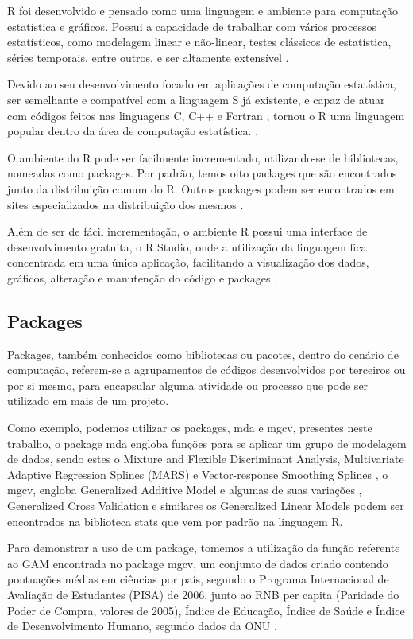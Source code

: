 \documentclass[
    12pt,               %
    openright,          %
    oneside,            %
    a4paper,            %
    english,            %
    brazil              %
    ]{abntex2}
\begin{document}
R foi desenvolvido e pensado como uma linguagem e ambiente para computação estatística e gráficos. Possui a capacidade de trabalhar com 
vários processos estatísticos, como modelagem linear e não-linear, testes clássicos de estatística, séries temporais, entre outros, 
e ser altamente extensível \cite{ling_r}.

Devido ao seu desenvolvimento focado em aplicações de computação estatística, ser semelhante e compatível com a linguagem S já existente, 
e capaz de atuar com códigos feitos nas linguagens C, C++ e Fortran \cite{ling_r}, tornou o R uma linguagem popular dentro da área 
de computação estatística. \cite{linguagem_r}.

O ambiente do R pode ser facilmente incrementado, utilizando-se de bibliotecas, nomeadas como packages. Por padrão, temos oito packages 
que são encontrados junto da distribuição comum do R. Outros packages podem ser encontrados em sites especializados na distribuição dos 
mesmos \cite{ling_r}.

Além de ser de fácil incrementação, o ambiente R possui uma interface de desenvolvimento gratuita, o R Studio, onde a utilização da 
linguagem fica concentrada em uma única aplicação, facilitando a visualização dos dados, gráficos, alteração e manutenção do código e 
packages \cite{rstudio}.

\subsection{Packages}

Packages, também conhecidos como bibliotecas ou pacotes, dentro do cenário de computação, referem-se a agrupamentos de códigos 
desenvolvidos por terceiros ou por si mesmo, para encapsular alguma atividade ou processo que pode ser utilizado em mais de um projeto.

Como exemplo, podemos utilizar os packages, mda e mgcv, presentes neste trabalho, o package mda engloba funções para se aplicar
um grupo de modelagem de dados, sendo estes o Mixture and Flexible Discriminant Analysis, Multivariate Adaptive Regression 
Splines (MARS) e Vector-response Smoothing Splines \cite{mda}, o mgcv, engloba Generalized Additive Model e algumas de suas variações
, Generalized Cross Validation e similares \cite{mgcv} os Generalized Linear Models podem ser encontrados na biblioteca stats que
vem por padrão na linguagem R.

Para demonstrar a uso de um package, tomemos a utilização da função referente ao GAM encontrada no package mgcv, um conjunto de dados
criado contendo pontuações médias em ciências por país, segundo o Programa Internacional de Avaliação de Estudantes (PISA) de 2006,
junto ao RNB per capita (Paridade do Poder de Compra, valores de 2005), Índice de Educação, Índice de Saúde e 
Índice de Desenvolvimento Humano, segundo dados da ONU \cite{gam_exemplo}.
\end{document}

